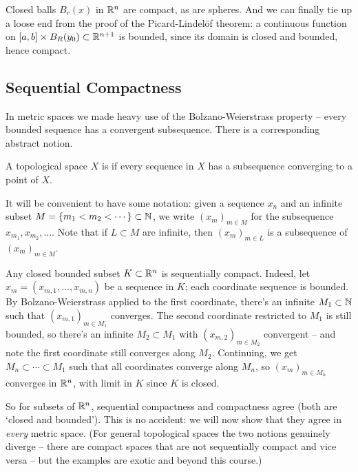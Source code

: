 \documentclass[a4paper]{scrartcl}
\begin{document}
\begin{example}
    Closed balls $B_r(x)$ in $\mathbb{R}^n$ are compact, as are spheres. And we can finally tie up a loose end from the proof of the Picard-Lindel\"of theorem: a continuous function on $[a, b] \times B_R(y_0) \subset \mathbb{R}^{n+1}$ is bounded, since its domain is closed and bounded, hence compact.
\end{example}

\subsection{Sequential Compactness}

In metric spaces we made heavy use of the Bolzano-Weierstrass property -- every bounded sequence has a convergent subsequence. There is a corresponding abstract notion.

\begin{definition}
    A topological space $X$ is  if every sequence in $X$ has a subsequence converging to a point of $X$.
\end{definition}

It will be convenient to have some notation: given a sequence $x_n$ and an infinite subset $M = \{m_1 < m_2 < \cdots\} \subset \mathbb{N}$, we write $(x_m)_{m \in M}$ for the subsequence $x_{m_1}, x_{m_2}, \dots$. Note that if $L \subset M$ are infinite, then $(x_m)_{m \in L}$ is a subsequence of $(x_m)_{m \in M}$.

\begin{example}\label{ex:bwrn}
    Any closed bounded subset $K \subset \mathbb{R}^n$ is sequentially compact. Indeed, let $x_m = (x_{m, 1}, \dots, x_{m, n})$ be a sequence in $K$; each coordinate sequence is bounded. By Bolzano-Weierstrass applied to the first coordinate, there's an infinite $M_1 \subset \mathbb{N}$ such that $(x_{m, 1})_{m \in M_1}$ converges. The second coordinate restricted to $M_1$ is still bounded, so there's an infinite $M_2 \subset M_1$ with $(x_{m, 2})_{m \in M_2}$ convergent -- and note the first coordinate still converges along $M_2$. Continuing, we get $M_n \subset \cdots \subset M_1$ such that all coordinates converge along $M_n$, so $(x_m)_{m \in M_n}$ converges in $\mathbb{R}^n$, with limit in $K$ since $K$ is closed.
\end{example}

So for subsets of $\mathbb{R}^n$, sequential compactness and compactness agree (both are `closed and bounded'). This is no accident: we will now show that they agree in \emph{every} metric space. (For general topological spaces the two notions genuinely diverge -- there are compact spaces that are not sequentially compact and vice versa -- but the examples are exotic and beyond this course.)
\end{document}
